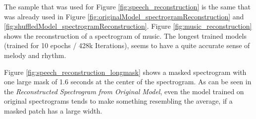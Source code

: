 The sample that was used for Figure \ref{fig:speech_reconstruction} is the same that was already used in Figure \ref{fig:originalModel_spectrogramReconstruction} and \ref{fig:shuffledModel_spectrogramReconstruction}. Figure \ref{fig:music_reconstruction} shows the reconstruction of a spectrogram of music. The longest trained models (trained for 10 epochs / 428k Iterations), seems to have a quite accurate sense of melody and rhythm.

Figure \ref{fig:speech_reconstruction_longmask} shows a masked spectrogram with one large mask of 1.6 seconds at the center of the spectrogram. As can be seen in the \textit{Reconstructed Spectrogram from Original Model}, even the model trained on original spectrograms tends to make something resembling the average, if a masked patch has a large width.

